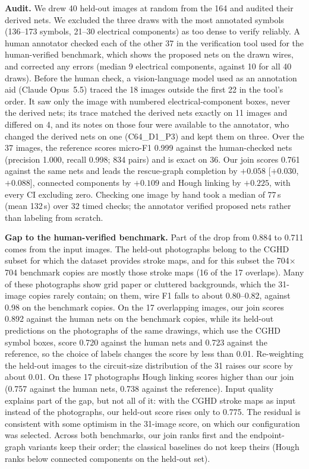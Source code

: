 \documentclass[journal]{IEEEtran}
\begin{document}
\textbf{Audit.} We drew 40 held-out images at random from the 164 and audited their derived nets. We excluded the three draws with the most annotated symbols (136--173 symbols, 21--30 electrical components) as too dense to verify reliably. A human annotator checked each of the other 37 in the verification tool used for the human-verified benchmark, which shows the proposed nets on the drawn wires, and corrected any errors (median 9 electrical components, against 10 for all 40 draws). Before the human check, a vision-language model used as an annotation aid (Claude Opus~5.5) traced the 18 images outside the first 22 in the tool's order. It saw only the image with numbered electrical-component boxes, never the derived nets; its trace matched the derived nets exactly on 11 images and differed on 4, and its notes on those four were available to the annotator, who changed the derived nets on one (C64\_D1\_P3) and kept them on three. Over the 37 images, the reference scores micro-F1 0.999 against the human-checked nets (precision 1.000, recall 0.998; 834 pairs) and is exact on 36. Our join scores 0.761 against the same nets and leads the rescue-graph completion by $+0.058$ [$+0.030$, $+0.088$], connected components by $+0.109$ and Hough linking by $+0.225$, with every CI excluding zero. Checking one image by hand took a median of 77\,s (mean 132\,s) over 32 timed checks; the annotator verified proposed nets rather than labeling from scratch.

\textbf{Gap to the human-verified benchmark.} Part of the drop from 0.884 to 0.711 comes from the input images. The held-out photographs belong to the CGHD subset for which the dataset provides stroke maps, and for this subset the 704$\times$704 benchmark copies are mostly those stroke maps (16 of the 17 overlaps). Many of these photographs show grid paper or cluttered backgrounds, which the 31-image copies rarely contain; on them, wire F1 falls to about 0.80--0.82, against 0.98 on the benchmark copies. On the 17 overlapping images, our join scores 0.892 against the human nets on the benchmark copies, while its held-out predictions on the photographs of the same drawings, which use the CGHD symbol boxes, score 0.720 against the human nets and 0.723 against the reference, so the choice of labels changes the score by less than 0.01. Re-weighting the held-out images to the circuit-size distribution of the 31 raises our score by about 0.01. On these 17 photographs Hough linking scores higher than our join (0.757 against the human nets, 0.738 against the reference). Input quality explains part of the gap, but not all of it: with the CGHD stroke maps as input instead of the photographs, our held-out score rises only to 0.775. The residual is consistent with some optimism in the 31-image score, on which our configuration was selected. Across both benchmarks, our join ranks first and the endpoint-graph variants keep their order; the classical baselines do not keep theirs (Hough ranks below connected components on the held-out set).
\end{document}
